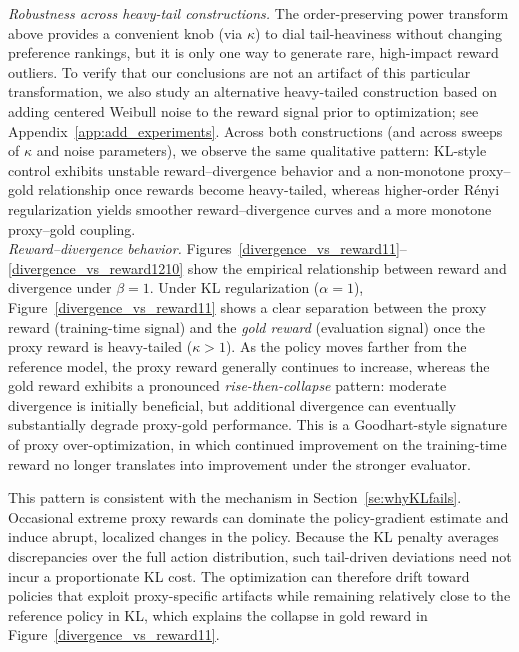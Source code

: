 \documentclass[11pt]{article}
\renewcommand{\paragraph}[1]{\noindent\textit{#1}}
\providecommand{\Renyi}{R\'enyi }
\begin{document}
\noindent\textit{Robustness across heavy-tail constructions.}
The order-preserving power transform above provides a convenient knob (via $\kappa$) to dial tail-heaviness without changing preference rankings, but it is only one way to generate rare, high-impact reward outliers.
To verify that our conclusions are not an artifact of this particular transformation, we also study an alternative heavy-tailed construction based on adding centered Weibull noise to the reward signal prior to optimization; see Appendix~\ref{app:add_experiments}.
Across both constructions (and across sweeps of $\kappa$ and noise parameters), we observe the same qualitative pattern: KL-style control exhibits unstable reward--divergence behavior and a non-monotone proxy--gold relationship once rewards become heavy-tailed, whereas higher-order \Renyi regularization yields smoother reward--divergence curves and a more monotone proxy--gold coupling.\\






\paragraph{Reward--divergence behavior.} Figures~\ref{divergence_vs_reward11}--\ref{divergence_vs_reward1210} show the empirical relationship between reward and divergence under $\beta=1$.
Under KL regularization ($\alpha=1$), Figure~\ref{divergence_vs_reward11} shows a clear separation between the proxy reward (training-time signal) and the \emph{gold reward} (evaluation signal) once the proxy reward is heavy-tailed ($\kappa>1$). As the policy moves farther from the reference model, the proxy reward generally continues to increase, whereas the gold reward exhibits a pronounced \emph{rise-then-collapse} pattern: moderate divergence is initially beneficial, but additional divergence can eventually substantially degrade proxy-gold performance. This is a Goodhart-style signature of proxy over-optimization, in which continued improvement on the training-time reward no longer translates into improvement under the stronger evaluator.


This pattern is consistent with the mechanism in Section~\ref{se:whyKLfails}. Occasional extreme proxy rewards can dominate the policy-gradient estimate and induce abrupt, localized changes in the policy. Because the KL penalty averages discrepancies over the full action distribution, such tail-driven deviations need not incur a proportionate KL cost. The optimization can therefore drift toward policies that exploit proxy-specific artifacts while remaining relatively close to the reference policy in KL, which explains the collapse in gold reward in Figure~\ref{divergence_vs_reward11}.
\end{document}
